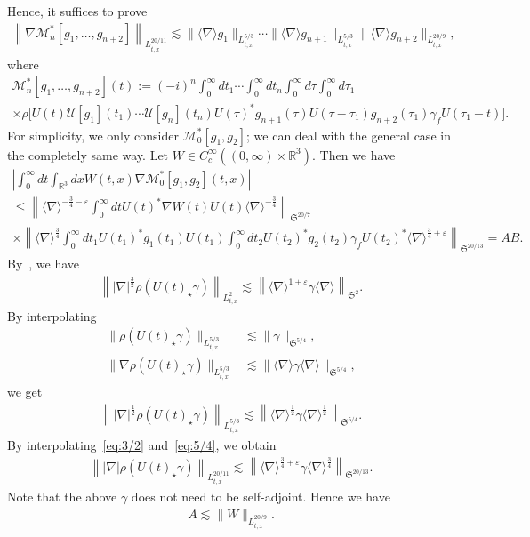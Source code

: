 \documentclass[10pt,a4paper]{amsart}
\providecommand{\No}[1]{\left\| #1 \right\|}
\newcommand{\CM}{\mathcal{M}}
\newcommand{\CU}{\mathcal{U}}
\newcommand{\FS}{\mathfrak{S}}
\newcommand{\ga}{\gamma}
\newcommand{\ep}{\varepsilon}
\newcommand{\ta}{\tau}
\newcommand{\rh}{\rho}
\newcommand{\abs}[1]{\left|#1\right|}
\renewcommand{\No}[1]{\left\| #1 \right\|}
\newcommand{\I}{\infty}
\newcommand{\sd}{\langle \nabla \rangle}
\newcommand{\tx}{{t,x}}
\newcommand{\st}{\star}
\newcommand{\fh}{\frac{3}{4}}
\newcommand{\R}{\mathbb{R}}
\newcommand{\tw}{\frac{1}{2}}
\newcommand{\na}{\nabla}
\newcommand{\ls}{\lesssim}
\begin{document}
Hence, it suffices to prove
\begin{align}\label{eq:M}
\left\|\na\CM_n^*[g_1,\dots,g_{n+2}] \right\|_{L^{20/11}_\tx} \ls \|\sd g_1\|_{L^{5/3}_\tx}\cdots \|\sd g_{n+1}\|_{L^{5/3}_\tx} \|\sd g_{n+2}\|_{L^{20/9}_\tx},
\end{align}
where
\begin{multline}
\CM^*_n[g_1, \dots, g_{n+2}](t) := (-i)^{n} \int_0^\I dt_1 \cdots \int_0^\I dt_n \int_0^{\I} d\ta \int_0^\I d\ta_1 \\
 \times \rh \Big[U(t) \CU[g_1](t_1) \cdots \CU[g_n](t_n) U(\ta)^* g_{n+1}(\ta) U(\ta-\ta_1)g_{n+2}(\ta_1) \ga_f U(\ta_1-t) \Big].
\end{multline}
For simplicity, we only consider $\CM_0^*[g_1,g_2]$; we can deal with the general case in the completely same way. Let $W \in C_c^\I((0,\I)\times \R^3)$. Then we have
\begin{multline}
\abs{\int_0^\I dt \int_{\R^3} dx W(t,x) \na \CM_0^*[g_1,g_2](t,x) } \\
\le \No{\sd^{-\fh-\ep} \int_0^\I dt U(t)^* \na W(t) U(t)\sd^{-\fh} }_{\FS^{20/7}} \\
\times \No{\sd^{\fh} \int_0^\I dt_1 U(t_1)^* g_1(t_1) U(t_1) \int_0^\I dt_2 U(t_2)^* g_2(t_2)\ga_f U(t_2)^* \sd^{\fh+\ep} }_{\FS^{20/13}} = A B.
\end{multline}
By~\cite[Theorem~3.1]{2018CHP}, we have
\begin{align}\label{eq:3/2}
\left\||\na|^{\frac{3}{2}}\rh(U(t)_\st \ga)\right\|_{L^2_\tx} \ls \left\|\sd^{1+\ep} \ga \sd\right\|_{\FS^2}.
\end{align}
By interpolating
\begin{align}
\|\rh(U(t)_\st \ga)\|_{L^{5/3}_\tx} &\ls \|\ga\|_{\FS^{5/4}}, \\
\|\na \rh(U(t)_\st \ga)\|_{L^{5/3}_\tx} &\ls \|\sd \ga \sd\|_{\FS^{5/4}},
\end{align}
we get
\begin{align}\label{eq:5/4}
\left\||\na|^{\tw}\rh(U(t)_\st \ga)\right\|_{L^{5/3}_\tx} \ls \left\|\sd^\tw \ga \sd^\tw\right\|_{\FS^{5/4}}.
\end{align}
By interpolating~\eqref{eq:3/2} and~\eqref{eq:5/4}, we obtain
\begin{align}
\left\||\na| \rh(U(t)_\st \ga)\right\|_{L^{20/11}_\tx} \ls \left\|\sd^{\fh+\ep} \ga \sd^\fh\right\|_{\FS^{20/13}}.
\end{align}
Note that the above $\ga$ does not need to be self-adjoint. Hence we have
\begin{align}
A \ls \|W\|_{L^{20/9}_\tx}.
\end{align}
\end{document}
